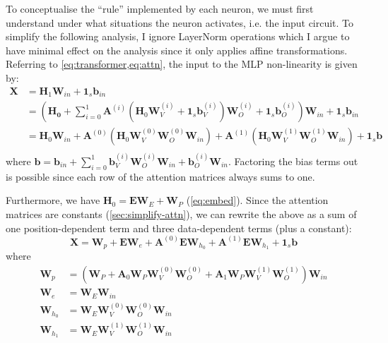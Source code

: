 \documentclass{article}
\renewcommand{\v}[1]{\mathbf{\bm{#1}}}
\newcommand{\m}[1]{\mathbf{\bm{#1}}}
\begin{document}
To conceptualise the ``rule'' implemented by each neuron, we must first understand under what situations the neuron activates, i.e. the input circuit. To simplify the following analysis, I ignore LayerNorm operations which I argue to have minimal effect on the analysis since it only applies affine transformations. Referring to \cref{eq:transformer,eq:attn}, the input to the MLP non-linearity is given by:
\begin{equation*}
    \begin{aligned}
        \m{X} & = \m{H}_1 \m{W}_{in} + \v{1}_s \v{b}_{in} \\
              & = \left(
        \m{H_0}
        + \sum_{i=0}^1 \m{A}^{(i)} (
        \m{H}_0 \m{W}_V^{(i)} + \v{1}_s \v{b}_V^{(i)}
        ) \m{W}_O^{(i)} + \v{1}_s \v{b}_O^{(i)}
        \right) \m{W}_{in} + \v{1}_s \v{b}_{in}           \\
              & = \m{H}_0 \m{W}_{in}
        + \m{A}^{(0)} (\m{H}_0 \m{W}_V^{(0)} \m{W}_O^{(0)} \m{W}_{in})
        + \m{A}^{(1)} (\m{H}_0 \m{W}_V^{(1)} \m{W}_O^{(1)} \m{W}_{in})
        + \v{1}_s \v{b}                                   \\
    \end{aligned}
\end{equation*}
where $\v{b} = \v{b}_{in} + \sum_{i=0}^{1} \v{b}_V^{(i)} \m{W}_O^{(i)} \m{W}_{in} + \v{b}_O^{(i)} \m{W}_{in}$. Factoring the bias terms out is possible since each row of the attention matrices always sums to one.

Furthermore, we have $\m{H}_0 = \m{E} \m{W}_E + \m{W}_P$ (\cref{eq:embed}). Since the attention matrices are constants (\cref{sec:simplify-attn}), we can rewrite the above as a sum of one position-dependent term and three data-dependent terms (plus a constant):
\begin{equation} \label{eq:four-circuits}
    \m{X} =
    \m{W}_p
    + \m{E} \m{W}_e
    + \m{A}^{(0)} \m{E} \m{W}_{h_0}
    + \m{A}^{(1)} \m{E} \m{W}_{h_1}
    + \v{1}_s \v{b}
\end{equation}
where
\begin{equation*}
    \begin{aligned}
        \m{W}_p
         & = \left(\m{W}_P
        + \m{A}_0 \m{W}_P \m{W}_V^{(0)} \m{W}_O^{(0)}
        + \m{A}_1 \m{W}_P \m{W}_V^{(1)} \m{W}_O^{(1)}
        \right) \m{W}_{in}                                  \\
        \m{W}_e
         & = \m{W}_E \m{W}_{in}                             \\
        \m{W}_{h_0}
         & = \m{W}_E \m{W}_V^{(0)} \m{W}_O^{(0)} \m{W}_{in} \\
        \m{W}_{h_1}
         & = \m{W}_E \m{W}_V^{(1)} \m{W}_O^{(1)} \m{W}_{in}
    \end{aligned}
\end{equation*}
\end{document}
